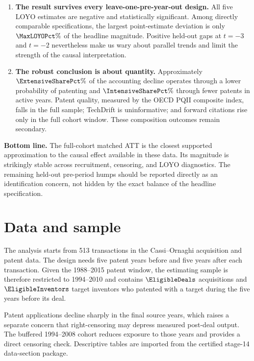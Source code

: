 \documentclass[10pt,a4paper]{article}
\newcommand{\keybox}[1]{%
  \noindent\colorbox{ThesisLight}{%
    \parbox{\dimexpr\linewidth-2\fboxsep\relax}{\color{ThesisInk}#1}}}
\begin{document}
\begin{enumerate}
  \item \textbf{The result survives every leave-one-pre-year-out design.}
  All five LOYO estimates are negative and statistically significant. Among
  directly comparable specifications, the largest point-estimate deviation
  is only \(\MaxLOYOPct\%\) of the headline magnitude. Positive held-out gaps
  at \(t=-3\) and \(t=-2\) nevertheless make us wary about parallel trends
  and limit the strength of the causal interpretation.

  \item \textbf{The robust conclusion is about quantity.} Approximately
  \(\ExtensiveSharePct\%\) of the accounting decline operates through a lower
  probability of patenting and \(\IntensiveSharePct\%\) through fewer patents
  in active years. Patent quality, measured by the OECD PQII composite index,
  falls in the full sample; TechDrift is uninformative; and forward citations
  rise only in the full cohort window. These composition outcomes remain
  secondary.
\end{enumerate}

\keybox{\textbf{Bottom line.} The full-cohort matched ATT is the closest
supported approximation to the causal effect available in these data. Its
magnitude is strikingly stable across recruitment, censoring, and LOYO
diagnostics. The remaining held-out pre-period humps should be reported
directly as an identification concern, not hidden by the exact balance
of the headline specification.}

\section{Data and sample}

The analysis starts from 513 transactions in the Cassi--Ornaghi acquisition
and patent data. The design needs five patent years before and five years
after each transaction. Given the 1988--2015 patent window, the estimating
sample is therefore restricted to 1994--2010 and contains
\(\EligibleDeals\) acquisitions and \(\EligibleInventors\) target inventors
who patented with a target during the five years before its deal.

Patent applications decline sharply in the final source years, which raises a
separate concern that right-censoring may depress measured post-deal output.
The buffered 1994--2008 cohort reduces exposure to those years and provides a
direct censoring check. Descriptive tables are imported from the certified
stage-14 data-section package.
\end{document}
